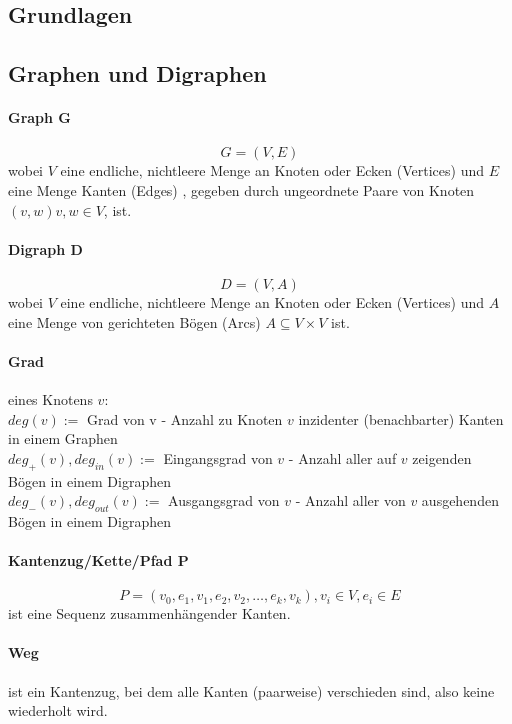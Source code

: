 \documentclass[10pt,a4paper,landscape]{article}
\begin{document}
	\begin{multicols*}{2}
        \normalsize

        
        \section{ Grundlagen }
            \subsection{ Graphen und Digraphen }
            
            \paragraph*{ Graph G }
            \[ G = (V,E) \]
            wobei $V$ eine endliche, nichtleere Menge an Knoten oder Ecken (Vertices) und $E$ eine Menge Kanten (Edges) 
            , gegeben durch ungeordnete Paare von Knoten $(v,w) v, w \in V$, ist.
            
            \paragraph*{ Digraph D }
            \[ D = (V,A)\]
            wobei $V$ eine endliche, nichtleere Menge an Knoten oder Ecken (Vertices) und $A$ eine Menge von gerichteten 
            Bögen (Arcs) $A \subseteq V \times V$ ist.

            \paragraph*{ Grad } eines Knotens $v$: \\
            $deg(v) :=$ Grad von v - Anzahl zu Knoten $v$ inzidenter (benachbarter) Kanten in einem Graphen \\
            $deg_{+}(v), deg_{in}(v) :=$ Eingangsgrad von $v$ - Anzahl aller auf $v$ zeigenden Bögen in einem Digraphen \\
            $deg_{-}(v), deg_{out}(v) :=$ Ausgangsgrad von $v$ - Anzahl aller von $v$ ausgehenden Bögen in einem Digraphen 

            \paragraph*{ Kantenzug/Kette/Pfad P }
            \[ P = (v_0, e_1, v_1, e_2, v_2, \dots, e_k, v_k), v_i \in V, e_i \in E \]
            ist eine Sequenz zusammenhängender Kanten. 
            \paragraph*{ Weg } ist ein Kantenzug, bei dem alle Kanten (paarweise) verschieden sind, also keine wiederholt wird.

\end{multicols*}
\end{document}
